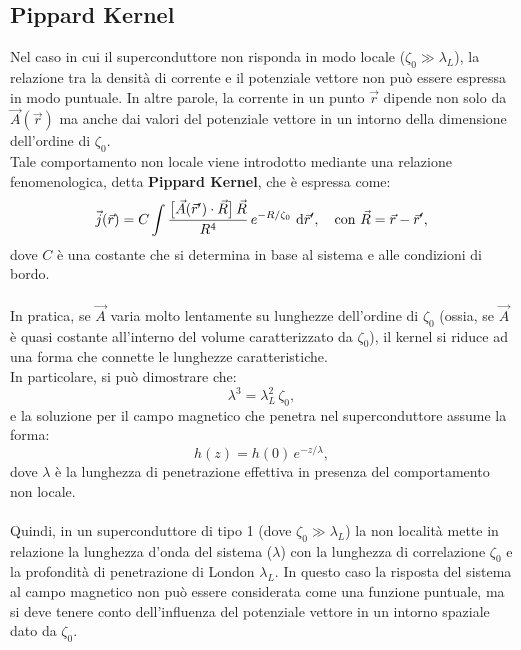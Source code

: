 \subsection{Pippard Kernel}
Nel caso in cui il superconduttore non risponda in modo locale (\(\zeta_0 \gg \lambda_L\)), la relazione tra la densità di corrente e il potenziale vettore non può essere espressa in modo puntuale. In altre parole, la corrente in un punto \(\vec{r}\) dipende non solo da \(\vec{A}(\vec{r})\) ma anche dai valori del potenziale vettore in un intorno della dimensione dell'ordine di \(\zeta_0\). \\
Tale comportamento non locale viene introdotto mediante una relazione fenomenologica, detta \textbf{Pippard Kernel}, che è espressa come:
\[
\vec{j}(\vec{r}) = C \int \frac{\bigl[\vec{A}(\vec{r}') \cdot \vec{R}\bigr]\, \vec{R}}{R^4}\, e^{-R/\zeta_0}\ \text{d}\vec{r}',\quad \text{con } \vec{R} = \vec{r} - \vec{r}',
\]
dove \(C\) è una costante che si determina in base al sistema e alle condizioni di bordo.\\\\
In pratica, se \(\vec{A}\) varia molto lentamente su lunghezze dell'ordine di \(\zeta_0\) (ossia, se \(\vec{A}\) è quasi costante all'interno del volume caratterizzato da \(\zeta_0\)), il kernel si riduce ad una forma che connette le lunghezze caratteristiche. \\
In particolare, si può dimostrare che:
\[
\lambda^3 = \lambda_L^2\, \zeta_0,
\]
e la soluzione per il campo magnetico che penetra nel superconduttore assume la forma:
\[
h(z) = h(0)\, e^{-z/\lambda},
\]
dove \(\lambda\) è la lunghezza di penetrazione effettiva in presenza del comportamento non locale.\\\\
Quindi, in un superconduttore di tipo 1 (dove \(\zeta_0 \gg \lambda_L\)) la non località mette in relazione la lunghezza d'onda del sistema (\(\lambda\)) con la lunghezza di correlazione \(\zeta_0\) e la profondità di penetrazione di London \(\lambda_L\). In questo caso la risposta del sistema al campo magnetico non può essere considerata come una funzione puntuale, ma si deve tenere conto dell'influenza del potenziale vettore in un intorno spaziale dato da \(\zeta_0\).


